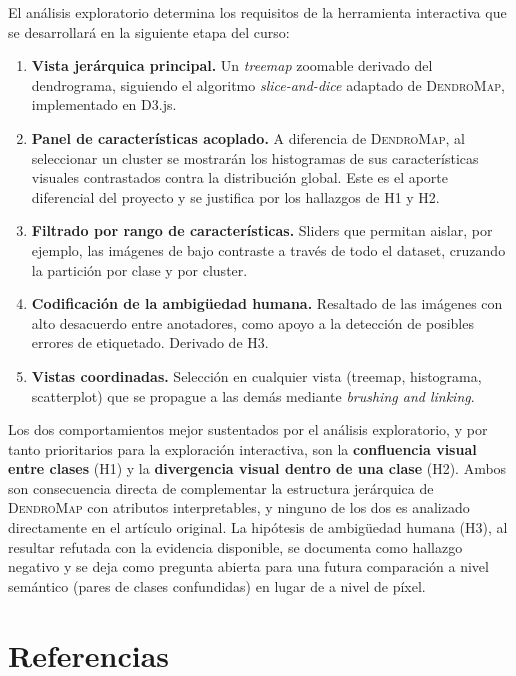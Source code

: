 \documentclass[11pt,a4paper]{article}
\begin{document}
El análisis exploratorio determina los requisitos de la herramienta interactiva
que se desarrollará en la siguiente etapa del curso:

\begin{enumerate}[leftmargin=*]
  \item \textbf{Vista jerárquica principal.} Un \emph{treemap} zoomable derivado
  del dendrograma, siguiendo el algoritmo \emph{slice-and-dice} adaptado de
  \textsc{DendroMap}, implementado en D3.js.
  \item \textbf{Panel de características acoplado.} A diferencia de
  \textsc{DendroMap}, al seleccionar un cluster se mostrarán los histogramas de
  sus características visuales contrastados contra la distribución global. Este
  es el aporte diferencial del proyecto y se justifica por los hallazgos de H1
  y H2.
  \item \textbf{Filtrado por rango de características.} Sliders que permitan
  aislar, por ejemplo, las imágenes de bajo contraste a través de todo el
  dataset, cruzando la partición por clase y por cluster.
  \item \textbf{Codificación de la ambigüedad humana.} Resaltado de las imágenes
  con alto desacuerdo entre anotadores, como apoyo a la detección de posibles
  errores de etiquetado. Derivado de H3.
  \item \textbf{Vistas coordinadas.} Selección en cualquier vista (treemap,
  histograma, scatterplot) que se propague a las demás mediante \emph{brushing
  and linking}.
\end{enumerate}

Los dos comportamientos mejor sustentados por el análisis exploratorio, y por
tanto prioritarios para la exploración interactiva, son la \textbf{confluencia
visual entre clases} (H1) y la \textbf{divergencia visual dentro de una clase}
(H2). Ambos son consecuencia directa de complementar la estructura jerárquica
de \textsc{DendroMap} con atributos interpretables, y ninguno de los dos es
analizado directamente en el artículo original. La hipótesis de ambigüedad
humana (H3), al resultar refutada con la evidencia disponible, se documenta
como hallazgo negativo y se deja como pregunta abierta para una futura
comparación a nivel semántico (pares de clases confundidas) en lugar de a nivel
de píxel.

\section{Referencias}
\label{sec:refs}
\end{document}
